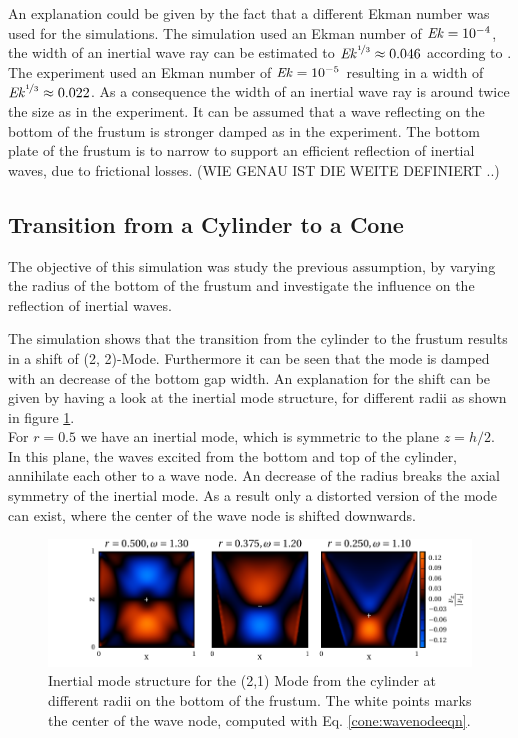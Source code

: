 An explanation could be given by the fact that a different Ekman number was used for the simulations.
The simulation used an Ekman number of $\mbox{\textit{Ek}} = 10^{-4}$, the width
of an inertial wave ray can be estimated to $\mbox{\textit{Ek}}^{\nicefrac{1}{3}}\approx 0.046$ according to \citep{ATPAPER}.
The experiment used an Ekman number of $\mbox{\textit{Ek}} = 10^{-5}$ resulting in a  width of $\mbox{\textit{Ek}}^{\nicefrac{1}{3}}\approx 0.022$.
As a consequence the width of an inertial wave ray is around twice the size as in the experiment.
It can be assumed that a wave reflecting on the bottom of the frustum
is stronger damped as in the experiment.
The bottom plate of the frustum is to narrow to support an efficient reflection
of inertial waves, due to frictional losses.
(WIE GENAU IST DIE WEITE DEFINIERT ..)

\subsection{Transition from a Cylinder to a Cone}

The objective of this simulation was study the previous assumption,
by varying the radius of the bottom of the frustum and investigate the influence
on the reflection of inertial waves.

The simulation shows that the transition from the cylinder
to the frustum results in a shift of (2, 2)-Mode.
Furthermore it can be seen that the mode is damped with an decrease of the bottom gap width.
An explanation for the shift can be given by having a look at the inertial mode structure,
 for different radii as shown in figure \ref{fig:cone:phase}.\\
For $r=0.5$ we have an inertial mode, which is symmetric to the plane $z=h/2$.
In this plane, the waves excited from the bottom and top of the cylinder, annihilate each other to a wave node.
An decrease of the radius breaks the axial symmetry of the inertial mode.
As a result only a distorted version of the mode can exist, where the center of the wave node
is shifted downwards.

\clearpage
\begin{figure}[!t]
  \centering
  \includegraphics{gfx/cone/transition/phase.pdf}
  \caption{\label{fig:cone:phase}
    Inertial mode structure for the (2,1) Mode from the cylinder at different radii on the bottom of the frustum.
    The white points marks the center of the wave node, computed with Eq.  \ref{cone:wavenodeeqn}.
  }
\end{figure}

